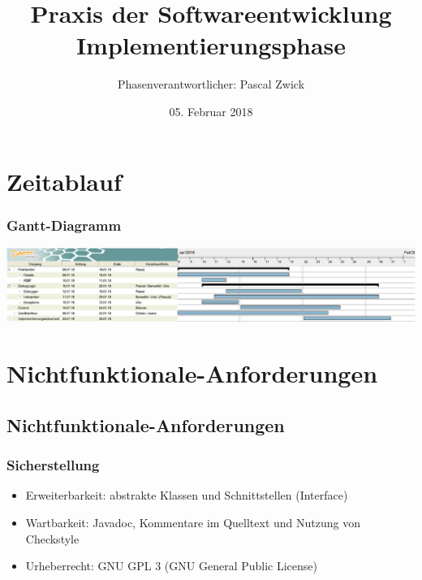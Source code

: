 \documentclass{beamer}
\title[Implementierungsphase]{Praxis der Softwareentwicklung\\ Implementierungsphase} %
\author{Phasenverantwortlicher: Pascal Zwick} %
\institute[PSE] %
{

}
\date{05. Februar 2018} %
\begin{document}
\begin{frame}
\titlepage %
\end{frame}



\section{Zeitablauf} %
\begin{frame}
\frametitle{Gantt-Diagramm}
\includegraphics[scale=0.4]{../ganntDiagramm_neu_crop.pdf}
\end{frame}

\section{Nichtfunktionale-Anforderungen}
\subsection{Nichtfunktionale-Anforderungen}
\begin{frame}
\frametitle{Sicherstellung}
\begin{itemize}
\item Erweiterbarkeit: abstrakte Klassen und Schnittstellen (Interface)
\item Wartbarkeit: Javadoc, Kommentare im Quelltext und Nutzung von Checkstyle
\item Urheberrecht: GNU GPL 3 (GNU General Public License)
\end{itemize}
\end{frame}
\end{document}
